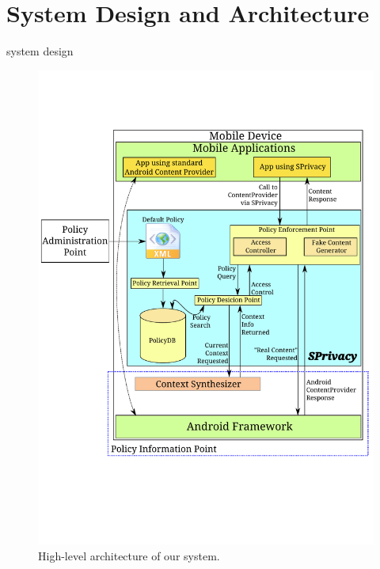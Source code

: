 \section{System Design and Architecture}

system design

\begin{figure}[!htb]
	\centering
	\includegraphics[width=\columnwidth]{images/architecture}
	\caption{High-level architecture of our system.}
	\label{fig:architecture}
\end{figure}
